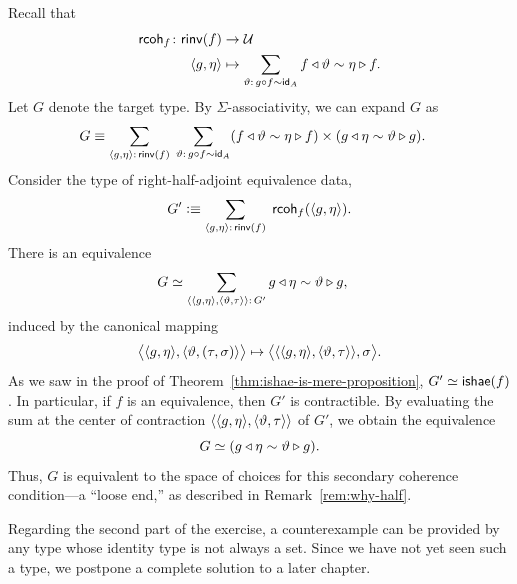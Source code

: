 \begin{solution}
    Recall that
    \begin{align*}
        \fun{rcoh}_f\colon\fun{rinv}(f)&\to\univ\\
        \dep{g,\eta}&\mapsto
            \sum_{\vartheta\colon g\circ f\sim\id_A}
                f\lwct\vartheta\sim\eta\rwct f.
    \end{align*}
    Let $G$ denote the target type. By $\Sigma$-associativity, we can expand $G$ as
    \begin{align*}
        G
            &\equiv
                \sum_{\dep{g,\eta}\colon\fun{rinv}(f)}\;
                \sum_{\vartheta\colon g\circ f\sim\id_A}
                    (f\lwct\vartheta\sim\eta\rwct f)
                    \times
                    (g\lwct\eta\sim\vartheta\rwct g).
    \end{align*}
    Consider the type of right-half-adjoint equivalence data,
    \begin{align*}
        G'\defeq
            \sum_{\dep{g,\eta}\colon\fun{rinv}(f)}\;
            \fun{rcoh}_f(\dep{g,\eta}).
    \end{align*}
    There is an equivalence
    \begin{align*}
        G&\simeq
        \sum_{
            \dep{
                \dep{g,\eta},
                \dep{\vartheta,\tau}
            }\colon G'
        }
        g\lwct\eta\sim\vartheta\rwct g,
    \end{align*}
    induced by the canonical mapping
    \[
        \bigl\langle
            \langle g,\eta\rangle,
            \langle\vartheta,(\tau,\sigma)\rangle
        \bigr\rangle
        \mapsto
        \bigl\langle
            \langle
                \langle g,\eta\rangle,
                \langle\vartheta,\tau\rangle\rangle,
            \sigma
        \bigr\rangle.
    \]
    As we saw in the proof of Theorem~\ref{thm:ishae-is-mere-proposition}, $G'\simeq\mathsf{ishae}(f)$. In particular, if $f$ is an equivalence, then $G'$ is contractible. By evaluating the sum at the center of contraction $\langle\langle g,\eta\rangle, \langle\vartheta,\tau\rangle\rangle$ of $G'$, we obtain the equivalence
    \[
        G\simeq (g\triangleleft\eta\sim\vartheta\triangleright g).
    \]
    Thus, $G$ is equivalent to the space of choices for this secondary coherence condition—a ``loose end,'' as described in Remark~\ref{rem:why-half}.

    Regarding the second part of the exercise, a counterexample can be provided by any type whose identity type is not always a set. Since we have not yet seen such a type, we postpone a complete solution to a later chapter.
    
\end{solution}

